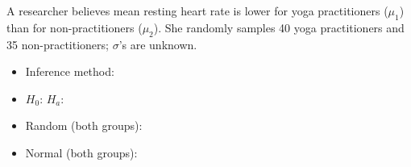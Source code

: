 \documentclass[10pt]{article}
\begin{document}
\begin{practicebox}
A researcher believes mean resting heart rate is lower for yoga practitioners ($\mu_1$) than
for non-practitioners ($\mu_2$). She randomly samples 40 yoga practitioners and 35 non-practitioners;
$\sigma$'s are unknown.

\begin{itemize}
  \item Inference method: 
  \item $H_0$:  \quad $H_a$: 
  \item Random (both groups): 
  \item Normal (both groups): 
\end{itemize}
\end{practicebox}
\end{document}
